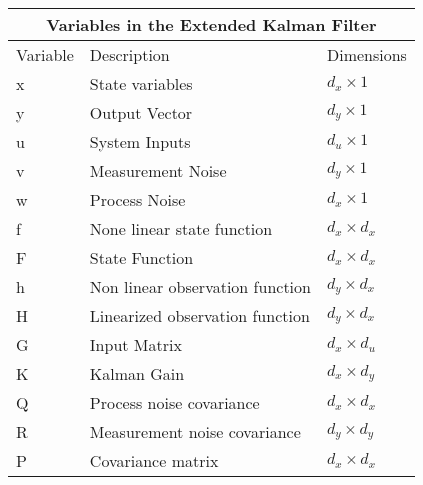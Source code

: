 \begin{center}
    
\centering
\begin{tabular}{ |p{2cm}||p{5cm}|p{2cm}| }
    \hline
    \multicolumn{3}{|c|}{Variables in the Extended Kalman Filter } \\ 
    \hline
    Variable & Description & Dimensions \\
    \hline
   x & State variables  & $d_x \times 1$ \\
    y & Output Vector  & $d_y \times 1$ \\
    u & System Inputs  & $d_u \times 1$\\
    v & Measurement Noise & $d_y \times 1$\\
    w & Process Noise & $d_x \times 1$\\
    f & None linear state function  & $d_x \times d_x $  \\ 
    F & State Function  & $d_x \times d_x $  \\ 
    h & Non linear observation function & $d_y \times d_x$\\
    H & Linearized observation function & $d_y \times d_x$\\
    G & Input Matrix & $d_x \times d_u$\\
    K & Kalman Gain  & $d_x \times d_y$\\
    Q & Process noise covariance  & $d_x \times d_x$ \\
    R & Measurement noise covariance &  $d_y \times d_y$\\
    P & Covariance matrix & $d_x \times d_x $  \\ 
    \hline
\end{tabular}
\end{center}
